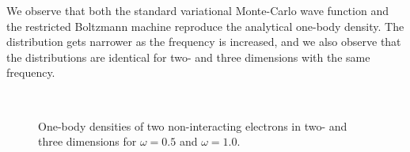 We observe that both the standard variational Monte-Carlo wave function and the restricted Boltzmann machine reproduce the analytical one-body density. The distribution gets narrower as the frequency is increased, and we also observe that the distributions are identical for two- and three dimensions with the same frequency.

\begin{figure}[h]
	\centering
	\\
	
	\caption{One-body densities of two non-interacting electrons in two- and three dimensions for $\omega=0.5$ and $\omega=1.0$.}%
	\label{fig:OB_nointeraction}
\end{figure}

\newpage
